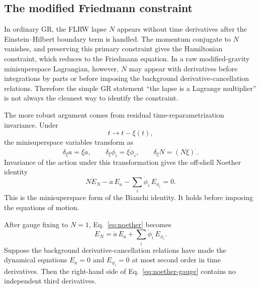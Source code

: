 \documentclass[aps,prd,twocolumn,superscriptaddress,nofootinbib,longbibliography]{revtex4-2}
\begin{document}
\subsection{The modified Friedmann constraint}
\label{sec:hamiltonian}
\label{subsec:modified-friedmann}



In ordinary GR, the FLRW lapse $N$ appears without time derivatives after the Einstein--Hilbert boundary term is handled.  The momentum conjugate to $N$ vanishes, and preserving this primary constraint gives the Hamiltonian constraint, which reduces to the Friedmann equation.  In a raw modified-gravity minisuperspace Lagrangian, however, $N$ may appear with derivatives before integrations by parts or before imposing the background derivative-cancellation relations.  Therefore the simple GR statement ``the lapse is a Lagrange multiplier'' is not always the cleanest way to identify the constraint.

The more robust argument comes from residual time-reparametrization invariance.  Under
\begin{equation}
t\rightarrow t-\xi(t),
\end{equation}
the minisuperspace variables transform as
\begin{equation}
\delta_\xi a=\xi\dot a,\qquad
\delta_\xi\phi_i=\xi\dot\phi_i,\qquad
\delta_\xi N=(N\xi)^{\cdot}.
\label{eq:time-diffeo}
\end{equation}
Invariance of the action under this transformation gives the off-shell Noether identity
\begin{equation}
N\dot E_N-\dot a\,E_a-\sum_i\dot\phi_i\,E_{\phi_i}=0.
\label{eq:noether}
\end{equation}
This is the minisuperspace form of the Bianchi identity.  It holds before imposing the equations of motion.



After gauge fixing to $N=1$, Eq.~\eqref{eq:noether} becomes
\begin{equation}
\dot E_N=\dot a\,E_a+\sum_i\dot\phi_i\,E_{\phi_i}.
\label{eq:noether-gauge}
\end{equation}
Suppose the background derivative-cancellation relations have made the dynamical equations $E_a=0$ and $E_{\phi_i}=0$ at most second order in time derivatives.  Then the right-hand side of Eq.~\eqref{eq:noether-gauge} contains no independent third derivatives.
\end{document}
